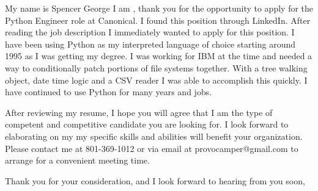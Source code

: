 \documentclass[11pt, a4paper]{awesome-cv}
\begin{document}
\makecvheader

\makelettertitle

\begin{cvletter}
My name is Spencer George I am , thank you for the opportunity to apply for the Python Engineer role at Canonical. I found this position through LinkedIn. After reading the job description I immediately wanted to apply for this position. I have been using Python as my interpreted language of choice starting around 1995 as I was getting my degree. I was working for IBM at the time and needed a way to conditionally patch portions of file systems together. With a tree walking object, date time logic and a CSV reader I was able to accomplish this quickly. I have continued to use Python for many years and jobs.




After reviewing my resume, I hope you will agree that I am the type of competent and competitive candidate you are looking for. I look forward to elaborating on my my specific skills and abilities will benefit your organization. Please contact me at 801-369-1012 or via email at provocamper@gmail.com to arrange for a convenient meeting time.

Thank you for your consideration, and I look forward to hearing from you soon,

\end{cvletter}

\makeletterclosing
\end{document}
